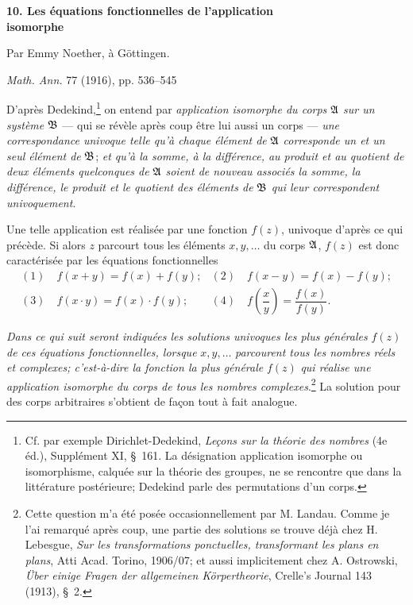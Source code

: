 \begin{center}
{\Large\bfseries 10. Les équations fonctionnelles de l'application\\ isomorphe}\par
\vspace{0.75em}
Par Emmy Noether, à Göttingen.\par
\vspace{1em}
\emph{Math. Ann.} 77 (1916), pp. 536--545
\end{center}

\vspace{2em}

D'après Dedekind,\footnote{Cf. par exemple Dirichlet-Dedekind, \emph{Leçons sur la théorie des nombres} (4e éd.), Supplément XI, \S\ 161. La désignation \og{}application isomorphe\fg{} ou \og{}isomorphisme\fg{}, calquée sur la théorie des groupes, ne se rencontre que dans la littérature postérieure; Dedekind parle des \og{}permutations d'un corps\fg{}.} on entend par \emph{application isomorphe du corps} $\mathfrak{A}$ \emph{sur un système} $\mathfrak{B}$ --- qui se révèle après coup être lui aussi un corps --- \emph{une correspondance univoque telle qu'à chaque élément de} $\mathfrak{A}$ \emph{corresponde un et un seul élément de} $\mathfrak{B}$; \emph{et qu'à la somme, à la différence, au produit et au quotient de deux éléments quelconques de} $\mathfrak{A}$ \emph{soient de nouveau associés la somme, la différence, le produit et le quotient des éléments de} $\mathfrak{B}$ \emph{qui leur correspondent univoquement}.

Une telle application est réalisée par une fonction $f(z)$, univoque d'après ce qui précède. Si alors $z$ parcourt tous les éléments $x,y,\ldots$ du corps $\mathfrak{A}$, $f(z)$ est donc caractérisée par les équations fonctionnelles
\[
\begin{array}{ll}
(1)\quad f(x+y)=f(x)+f(y); & (2)\quad f(x-y)=f(x)-f(y);\\[0.45em]
(3)\quad f(x\cdot y)=f(x)\cdot f(y); & (4)\quad f\!\left(\dfrac{x}{y}\right)=\dfrac{f(x)}{f(y)}.
\end{array}
\]

\emph{Dans ce qui suit seront indiquées les solutions univoques les plus générales} $f(z)$ \emph{de ces équations fonctionnelles, lorsque} $x,y,\ldots$ \emph{parcourent tous les nombres réels et complexes; c'est-à-dire la fonction la plus générale} $f(z)$ \emph{qui réalise une application isomorphe du corps de tous les nombres complexes}.\footnote{Cette question m'a été posée occasionnellement par M. Landau. Comme je l'ai remarqué après coup, une partie des solutions se trouve déjà chez H. Lebesgue, \emph{Sur les transformations ponctuelles, transformant les plans en plans}, Atti Acad. Torino, 1906/07; et aussi implicitement chez A. Ostrowski, \emph{Über einige Fragen der allgemeinen Körpertheorie}, Crelle's Journal 143 (1913), \S\ 2.} La solution pour des corps arbitraires s'obtient de façon tout à fait analogue.

